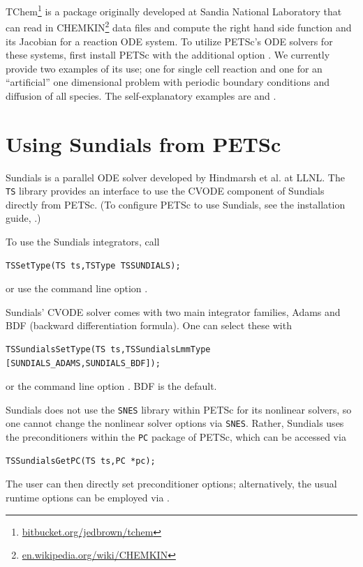 TChem\footnote{\href{https://bitbucket.org/jedbrown/tchem}{bitbucket.org/jedbrown/tchem}}
is a package originally developed at Sandia National Laboratory that can read in
CHEMKIN\footnote{\href{https://en.wikipedia.org/wiki/CHEMKIN}{en.wikipedia.org/wiki/CHEMKIN}}
data files and compute the right hand side function and its Jacobian for a reaction ODE system.
To utilize PETSc's ODE solvers for these systems, first install PETSc with the additional
 option . We currently provide two examples of its use;
one for single cell reaction and one for an ``artificial'' one dimensional problem with
periodic boundary conditions and diffusion of all species. The self-explanatory examples
are \href{https://www.mcs.anl.gov/petsc/petsc-current/src/ts/tutorials/extchem.c.html}{}
and \href{https://www.mcs.anl.gov/petsc/petsc-current/src/ts/tutorials/exchemfield.c.html}{}.

\section{Using Sundials from PETSc}
\label{sec_sundials}

Sundials is a parallel ODE solver developed by Hindmarsh et al. at
LLNL.  The \lstinline{TS} library provides an interface to use the
CVODE component of Sundials directly from PETSc.  (To configure PETSc
to use Sundials, see the installation
guide, .)

To use the Sundials integrators, call
\begin{lstlisting}
TSSetType(TS ts,TSType TSSUNDIALS);
\end{lstlisting}
or use the command line option  .
  

Sundials' CVODE solver comes with two main integrator families, Adams
and BDF (backward differentiation formula). One can select these with
\begin{lstlisting}
TSSundialsSetType(TS ts,TSSundialsLmmType [SUNDIALS_ADAMS,SUNDIALS_BDF]);
\end{lstlisting}
or the command line option . BDF is
the default. 
 

Sundials does not use the \lstinline{SNES} library within PETSc for its nonlinear
solvers, so one cannot change the nonlinear solver options via
\lstinline{SNES}. Rather, Sundials uses the preconditioners within the \lstinline{PC} package
of PETSc, which can be accessed via
\begin{lstlisting}
TSSundialsGetPC(TS ts,PC *pc);
\end{lstlisting}
The user can then directly set preconditioner options;
alternatively, the usual runtime options can be employed
via .

